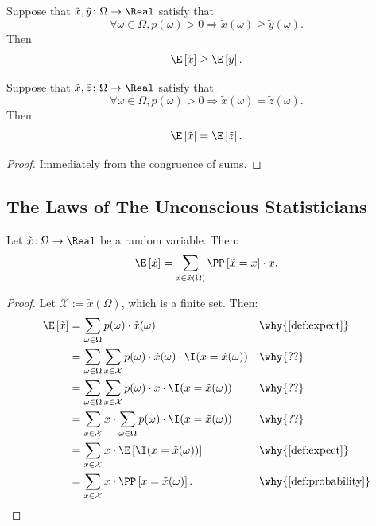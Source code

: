 \begin{theorem} \label{thm:exp-monotone}
  Suppose that $\tilde{x}, \tilde{y} \colon \Omega \to \Real$ satisfy that
  \[
    \forall \omega \in \Omega, p(\omega ) > 0 \Rightarrow \tilde{x}(\omega) \ge \tilde{y}(\omega).
  \]
  Then
  \[
   \E\left[\tilde{x}\right] \ge \E\left[\tilde{y}\right] .
  \]
\end{theorem}


\begin{theorem} \label{thm:exp-congr}
  Suppose that $\tilde{x}, \tilde{z} \colon \Omega \to \Real$ satisfy that
  \[
     \forall \omega \in \Omega, p(\omega) > 0 \Rightarrow \tilde{x}(\omega) = \tilde{z}(\omega).
  \]
  Then
  \[
   \E \left[ \tilde{x} \right] = \E \left[ \tilde{z} \right].
  \]
\end{theorem}
\begin{proof}
Immediately from the congruence of sums.
\end{proof}
\subsection{The Laws of The Unconscious Statisticians}

\begin{theorem} \label{thm:exp-sum-val}
Let $\tilde{x} \colon \Omega \to \Real $ be a random variable. Then:
\[
\E \left[ \tilde{x} \right]
=
\sum_{x\in \tilde{x}(\Omega)} \PP \left[ \tilde{x} = x \right] \cdot  x. 
\]
\end{theorem}
\begin{proof}
Let $\mathcal{X} := \tilde{x}(\Omega)$, which is a finite set. Then:
\begin{align*}
\E \left[ \tilde{x} \right]
&= \sum_{\omega \in \Omega } p(\omega ) \cdot \tilde{x}(\omega) && \why{\cref{def:expect}} \\
&= \sum_{\omega \in \Omega } \sum_{x\in \mathcal{X}} p(\omega ) \cdot \tilde{x}(\omega) \cdot \I(x =  \tilde{x}(\omega)) && \why{??} \\
&= \sum_{\omega \in \Omega } \sum_{x\in \mathcal{X}} p(\omega ) \cdot x \cdot \I(x =  \tilde{x}(\omega)) && \why{??} \\
&= \sum_{x\in \mathcal{X}} x \cdot \sum_{\omega \in \Omega }  p(\omega ) \cdot  \I(x =  \tilde{x}(\omega))  && \why{??}\\
&= \sum_{x\in \mathcal{X}} x \cdot \E \left[  \I(x =  \tilde{x}(\omega)) \right] && \why{\cref{def:expect}} \\
&= \sum_{x\in \mathcal{X}} x \cdot \PP \left[x =  \tilde{x}(\omega) \right]. && \why{\cref{def:probability}} 
\end{align*}
\end{proof}

